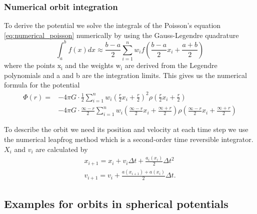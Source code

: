 \subsubsection{Numerical orbit integration}\label{sec:num_int}
To derive the potential we solve the integrals of the Poisson's equation \eqref{eq:numerical_poisson} numerically by using the Gauss-Legendre quadrature 
\begin{equation}\label{eq:Gauss-Legendre}
\int_a^b f(x)dx \approx \frac{b-a}{2}\sum_{i=1}^n w_i f\left(\frac{b-a}{2}x_i+\frac{a+b}{2}\right)
\end{equation} where the points \(\mathrm{x_i}\) and the weights \(\mathrm{w_i}\) are derived from the Legendre polynomials and a and b are the integration limits. This gives us the numerical formula for the potential 
\begin{equation}\label{eq:numerical_potential}
\begin{aligned}
\Phi(r)= & -4\pi G \cdot \frac{1}{2}\sum_{i=1}^n  w_i\left(\frac{r}{2}x_i+\frac{r}{2}\right)^2\rho\left(\frac{r}{2} x_i+ \frac{r}{2}\right) \\
&-4\pi G\cdot\frac{\infty-r}{2}\sum_{i=1}^n w_i\left(\frac{\infty-r}{2} x_i +\frac{\infty+r}{2}\right)\rho\left(\frac{\infty-r}{2} x_i +\frac{\infty+r}{2}\right)
\end{aligned}
\end{equation}
\par To describe the orbit we need its position and velocity at each time step we use the numerical leapfrog method which is a second-order time reversible integrator. \(X_i\) and \(v_i\) are calculated by 
\begin{align}
x_{i+1}=x_i+v_i\Delta t+\frac{a_i(x_i)}{2}\Delta t^2 \\
v_{i+1}=v_i+\frac{a(x_{i+1})+a(x_i)}{2}\Delta t.
\end{align}
\subsection{Examples for orbits in spherical potentials}\label{sec:orbit_examples}
